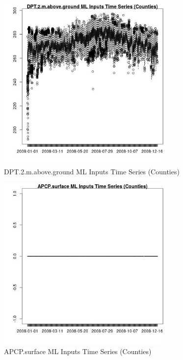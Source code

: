 \begin{figure} 
\centering  
\includegraphics[width=0.77\textwidth]{Code_Outputs/ML_input_report_ML_input_CountyGeometricCentroids_Locations_Dates_part_c_2008-01-01to2008-12-31_DPT.2.m.above.groundTS.jpg} 
\caption{\label{fig:ML_input_report_ML_input_CountyGeometricCentroids_Locations_Dates_part_c_2008-01-01to2008-12-31DPT.2.m.above.groundTS}DPT.2.m.above.ground ML Inputs Time Series (Counties)} 
\end{figure} 
 

\begin{figure} 
\centering  
\includegraphics[width=0.77\textwidth]{Code_Outputs/ML_input_report_ML_input_CountyGeometricCentroids_Locations_Dates_part_c_2008-01-01to2008-12-31_APCP.surfaceTS.jpg} 
\caption{\label{fig:ML_input_report_ML_input_CountyGeometricCentroids_Locations_Dates_part_c_2008-01-01to2008-12-31APCP.surfaceTS}APCP.surface ML Inputs Time Series (Counties)} 
\end{figure} 
 

